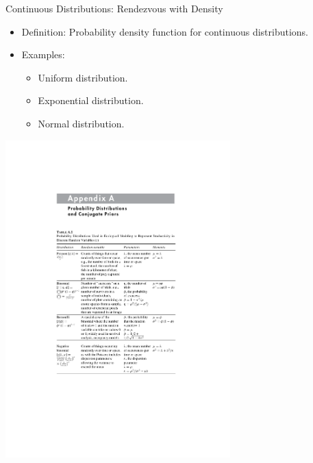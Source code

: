 \documentclass{beamer}
\begin{document}
\begin{frame}{Continuous Distributions: Rendezvous with Density}
  \begin{itemize}
    \item Definition: Probability density function for continuous distributions.
    \item Examples:
      \begin{itemize}
        \item Uniform distribution.
        \item Exponential distribution.
        \item Normal distribution.
      \end{itemize}
  \end{itemize}
\end{frame}


\begin{frame}
\begin{center}
  \includegraphics[page=1,width=0.65\textwidth]{distributions.pdf}
  \end{center}
\end{frame}
\end{document}
